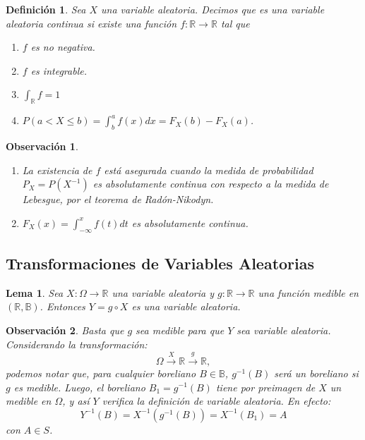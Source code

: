 \documentclass{report}
\newtheorem{lem}{Lema}[section]
\newtheorem{dfn}{Definición}[section]
\newtheorem{obs}{Observación}[section]
\begin{document}
\begin{dfn}
    Sea $X$ una variable aleatoria. Decimos que es una \emph{variable aleatoria continua} si existe una función $f:\mathbb{R}\rightarrow\mathbb{R}$ tal que
    \begin{enumerate}
        \item $f$ es no negativa.
        \item $f$ es integrable.
        \item $\int_{\mathbb{R}}f = 1$
        \item $P(a<X\leq b) = \int_{b}^{a} f(x)dx = F_X(b)-F_X(a)$.
    \end{enumerate}
\end{dfn}

\begin{obs}
    \begin{enumerate}
        Considerando una variable aleatoria cualquiera $X$:
        \item La existencia de $f$ está asegurada cuando la medida de probabilidad $P_X=P(X^{-1})$ es absolutamente continua con respecto a la medida de Lebesgue,
        por el teorema de Radón-Nikodyn.
        \item $F_X(x) = \int_{-\infty}^x f(t)dt$ es absolutamente continua.
    \end{enumerate}
\end{obs}

\subsection{Transformaciones de Variables Aleatorias}

\begin{lem}
    Sea $X:\Omega\rightarrow \mathbb{R}$ una variable aleatoria y $g:\mathbb{R}\rightarrow\mathbb{R}$ una función medible en $(\mathbb{R},\mathbb{B})$.
    Entonces $Y = g\circ X$ es una variable aleatoria.
\end{lem}

\begin{obs}
    Basta que $g$ sea medible para que $Y$ sea variable aleatoria. Considerando la transformación:
    \begin{equation*}
        \Omega \xrightarrow{X} \mathbb{R} \xrightarrow{g} \mathbb{R},
    \end{equation*}
    podemos notar que, para cualquier boreliano $B\in\mathbb{B}$, $g^{-1}(B)$ será un boreliano si $g$ es medible.
    Luego, el boreliano $B_1 = g^{-1}(B)$ tiene por preimagen de $X$ un medible en $\Omega$, y así $Y$ verifica la definición de variable aleatoria.
    En efecto:
    \begin{equation*}
        Y^{-1}(B) = X^{-1}(g^{-1}(B)) = X^{-1}(B_1) = A
    \end{equation*}
    con $A\in S$.
\end{obs}
\end{document}
